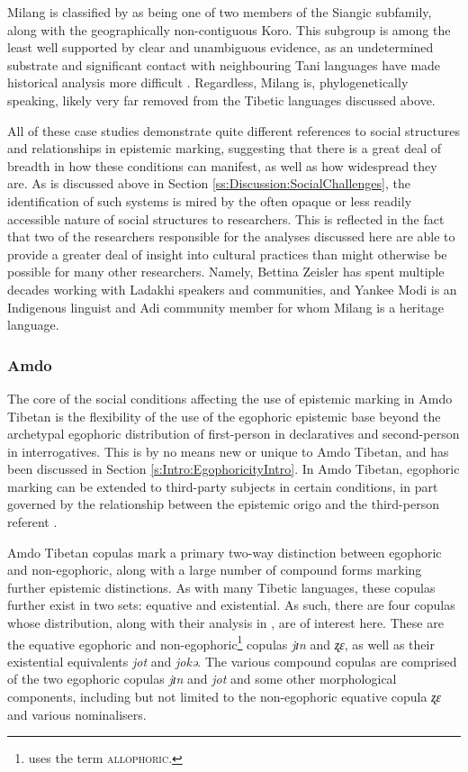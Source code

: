 Milang is classified by  as being one of two members of the Siangic subfamily, along with the geographically non-contiguous Koro. This subgroup is among the least well supported by clear and unambiguous evidence, as an undetermined substrate and significant contact with neighbouring Tani languages have made historical analysis more difficult \cite{Modi2017}. Regardless, Milang is, phylogenetically speaking, likely very far removed from the Tibetic languages discussed above.

All of these case studies demonstrate quite different references to social structures and relationships in epistemic marking, suggesting that there is a great deal of breadth in how these conditions can manifest, as well as how widespread they are. As is discussed above in Section \ref{ss:Discussion:SocialChallenges}, the identification of such systems is mired by the often opaque or less readily accessible nature of social structures to researchers. This is reflected in the fact that two of the researchers responsible for the analyses discussed here are able to provide a greater deal of insight into cultural practices than might otherwise be possible for many other researchers. Namely, Bettina Zeisler has spent multiple decades working with Ladakhi speakers and communities, and Yankee Modi is an Indigenous linguist and Adi community member for whom Milang is a heritage language.

\subsubsection{Amdo}\label{sss:Discussion:AmdoCase}
The core of the social conditions affecting the use of epistemic marking in Amdo Tibetan is the flexibility of the use of the egophoric epistemic base beyond the archetypal egophoric distribution of first-person in declaratives and second-person in interrogatives. This is by no means new or unique to Amdo Tibetan, and has been discussed in Section \ref{s:Intro:EgophoricityIntro}. In Amdo Tibetan, egophoric marking can be extended to third-party subjects in certain conditions, in part governed by the relationship between the epistemic origo and the third-person referent \cite{Tribur2019}.

Amdo Tibetan copulas mark a primary two-way distinction between egophoric and non-egophoric, along with a large number of compound forms marking further epistemic distinctions. As with many Tibetic languages, these copulas further exist in two sets: equative and existential. As such, there are four copulas whose distribution, along with their analysis in , are of interest here. These are the equative egophoric and non-egophoric\footnote{ uses the term \textsc{allophoric}.} copulas \textit{jɪn} and \textit{ʐɛ}, as well as their existential equivalents \textit{jot} and \textit{jokə}. The various compound copulas are comprised of the two egophoric copulas \textit{jɪn} and \textit{jot} and some other morphological components, including but not limited to the non-egophoric equative copula \textit{ʐɛ} and various nominalisers.

